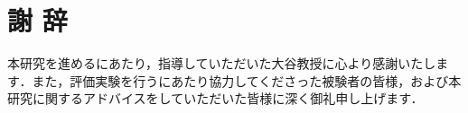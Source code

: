 \chapter*{謝 辞}
本研究を進めるにあたり，指導していただいた大谷教授に心より感謝いたします．また，評価実験を行うにあたり協力してくださった被験者の皆様，および本研究に関するアドバイスをしていただいた皆様に深く御礼申し上げます．